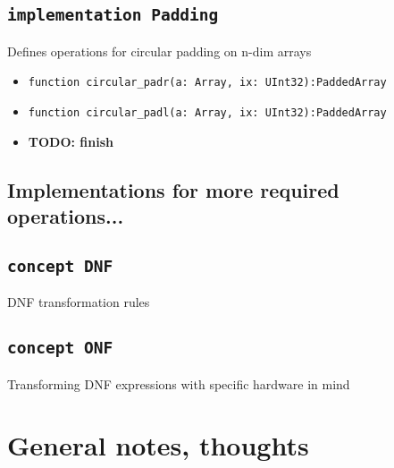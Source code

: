 \documentclass{article}
\begin{document}
\subsection{\texttt{implementation Padding}}
\noindent Defines operations for circular padding on n-dim arrays
\begin{itemize}
    \item \texttt{function circular\_padr(a: Array, ix: UInt32):PaddedArray}
    \item \texttt{function circular\_padl(a: Array, ix: UInt32):PaddedArray}
    \item \textbf{TODO: finish}
\end{itemize}

\subsection{Implementations for more required operations...}
\subsection{\texttt{concept DNF}}
\noindent DNF transformation rules
\subsection{\texttt{concept ONF}}
\noindent Transforming DNF expressions with specific hardware in mind

\section{General notes, thoughts}
\end{document}
